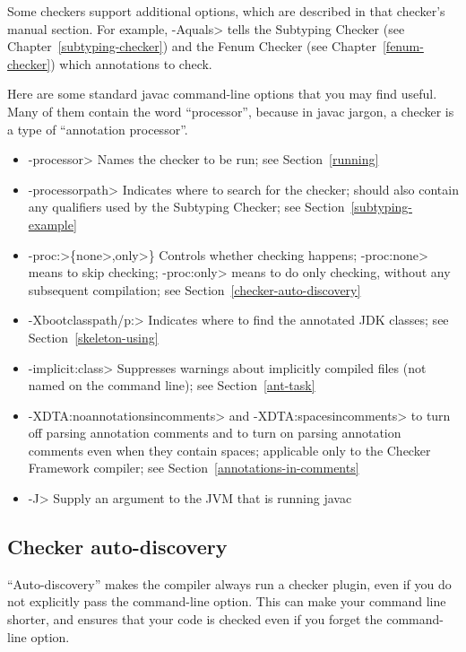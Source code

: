 \noindent
Some checkers support additional options, which are described in that
checker's manual section.
For example, \<-Aquals> tells
the Subtyping Checker (see Chapter~\ref{subtyping-checker}) and the Fenum Checker
(see Chapter~\ref{fenum-checker}) which annotations to check.


Here are some standard javac command-line options that you may find useful.
Many of them contain the word ``processor'', because in javac jargon, a
checker is a type of ``annotation processor''.

\begin{itemize}
\item \<-processor> Names the checker to be
  run; see Section~\ref{running}
\item \<-processorpath> Indicates where to search for the
  checker; should also contain any qualifiers used by the Subtyping
  Checker; see Section~\ref{subtyping-example}
\item \<-proc:>\{\<none>,\<only>\} Controls whether checking
  happens; \<-proc:none>
  means to skip checking; \<-proc:only> means to do only
  checking, without any subsequent compilation; see
  Section~\ref{checker-auto-discovery}
\item \<-Xbootclasspath/p:> Indicates where to find the annotated JDK classes;
  see Section~\ref{skeleton-using}
\item \<-implicit:class> Suppresses warnings about implicitly compiled files
  (not named on the command line); see Section~\ref{ant-task}
\item \<-XDTA:noannotationsincomments> and \<-XDTA:spacesincomments>
  to turn off parsing annotation comments and
  to turn on parsing annotation comments even when they
  contain spaces; applicable only to the Checker Framework compiler;
  see Section~\ref{annotations-in-comments}
\item \<-J> Supply an argument to the JVM that is running javac
\end{itemize}


\subsection{Checker auto-discovery\label{checker-auto-discovery}}

``Auto-discovery'' makes the  compiler always run a checker
plugin, even if you do not explicitly pass the 
command-line option.  This can make your command line shorter, and ensures
that your code is checked even if you forget the command-line option.

